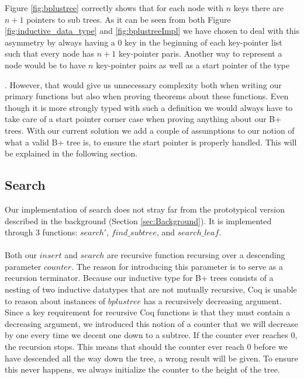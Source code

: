 Figure \ref{fig:bplustree} correctly shows that for each node with $n$ keys there are $n+1$ pointers to sub trees. As it can be seen from both Figure \ref{fig:inductive_data_type} and \ref{fig:bplustreeImpl} we have chosen to deal with this asymmetry by always having a $0$ key in the beginning of each key-pointer list such that every node has $n+1$ key-pointer paris. Another way to represent a node would be to have $n$ key-pointer pairs as well as a start pointer of the type \begin{coqdoccode}  \end{coqdoccode}. However, that would give us unnecessary complexity both when writing our primary functions but also when proving theorems about these functions. Even though it is more strongly typed with such a definition we would always have to take care of a start pointer corner case when proving anything about our B+ trees. With our current solution we add a couple of assumptions to our notion of what a valid B+ tree is, to ensure the start pointer is properly handled. This will be explained in the following section. 

\paragraph{}

\subsection{Search}
\label{subsec:search}
Our implementation of search does not stray far from the prototypical version described in the background (Section \ref{sec:Background}). It is implemented through 3 functions: $search'$, $find\_subtree$, and $search\_leaf$. 

\paragraph{}
Both our $insert$ and $search$ are recursive function recursing over a descending parameter $counter$. The reason for introducing this parameter is to serve as a recursion terminator. Because our inductive type for B+ trees consists of a nesting of two inductive datatypes that are not mutually recursive, Coq is unable to reason about instances of $bplustree$ has a recursively decreasing argument. Since a key requirement for recursive Coq functions is that they must contain a decreasing argument, we introduced this notion of a counter that we will decrease by one every time we decent one down to a subtree. If the counter ever reaches $0$, the recursion stops. This means that should the counter ever reach $0$ before we have descended all the way down the tree, a wrong result will be given. To ensure this never happens, we always initialize the counter to the height of the tree.

